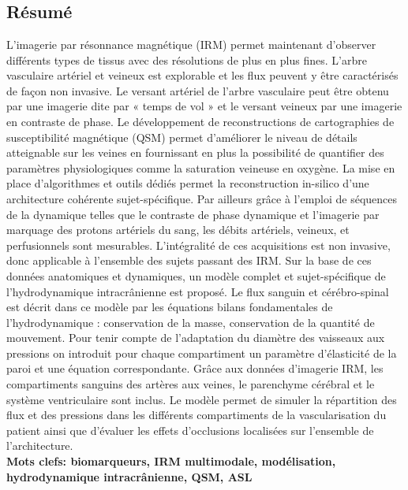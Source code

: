 \chapter*{}
\vspace{-6 cm}
\section*{Résumé}
L’imagerie par résonnance magnétique (IRM) permet maintenant d’observer différents types
de tissus avec des résolutions de plus en plus fines. L’arbre vasculaire artériel et veineux est explorable
et les flux peuvent y être caractérisés de façon non invasive. Le versant artériel de l’arbre vasculaire
peut être obtenu par une imagerie dite par « temps de vol » et le versant veineux par une imagerie en
contraste de phase. Le développement de reconstructions de cartographies de susceptibilité
magnétique (QSM) permet d’améliorer le niveau de détails atteignable sur les veines en fournissant
en plus la possibilité de quantifier des paramètres physiologiques comme la saturation veineuse en
oxygène. La mise en place d’algorithmes et outils dédiés permet la reconstruction in-silico d’une
architecture cohérente sujet-spécifique. Par ailleurs grâce à l’emploi de séquences de la dynamique
telles que le contraste de phase dynamique et l’imagerie par marquage des protons artériels du sang,
les débits artériels, veineux, et perfusionnels sont mesurables. L’intégralité de ces acquisitions est non
invasive, donc applicable à l’ensemble des sujets passant des IRM. Sur la base de ces données
anatomiques et dynamiques, un modèle complet et sujet-spécifique de l’hydrodynamique
intracrânienne est proposé. Le flux sanguin et cérébro-spinal est décrit dans ce modèle par les
équations bilans fondamentales de l’hydrodynamique : conservation de la masse, conservation de la
quantité de mouvement. Pour tenir compte de l’adaptation du diamètre des vaisseaux aux pressions
on introduit pour chaque compartiment un paramètre d’élasticité de la paroi et une équation
correspondante. Grâce aux données d’imagerie IRM, les compartiments sanguins des artères aux
veines, le parenchyme cérébral et le système ventriculaire sont inclus. Le modèle permet de simuler la
répartition des flux et des pressions dans les différents compartiments de la vascularisation du patient
ainsi que d’évaluer les effets d’occlusions localisées sur l’ensemble de l’architecture.\\
{\bf Mots clefs: biomarqueurs, IRM multimodale, modélisation, hydrodynamique intracrânienne, QSM,
ASL}
\vspace{-0.5 cm}
